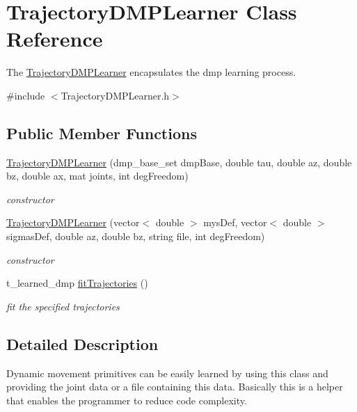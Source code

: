 \hypertarget{classTrajectoryDMPLearner}{\section{\-Trajectory\-D\-M\-P\-Learner \-Class \-Reference}
\label{classTrajectoryDMPLearner}
}


\-The \hyperlink{classTrajectoryDMPLearner}{\-Trajectory\-D\-M\-P\-Learner} encapsulates the dmp learning process.  




{\ttfamily \#include $<$\-Trajectory\-D\-M\-P\-Learner.\-h$>$}

\subsection*{\-Public \-Member \-Functions}
\begin{DoxyCompactItemize}
\item 
\hyperlink{classTrajectoryDMPLearner_ae80cd470937dcf56e62e6cbc7d958ecc}{\-Trajectory\-D\-M\-P\-Learner} (dmp\-\_\-base\-\_\-set dmp\-Base, double tau, double az, double bz, double ax, mat joints, int deg\-Freedom)
\begin{DoxyCompactList}\small\item\em constructor \end{DoxyCompactList}\item 
\hyperlink{classTrajectoryDMPLearner_a1bd0b3f7e7661d0675150c574ab443ef}{\-Trajectory\-D\-M\-P\-Learner} (vector$<$ double $>$ mys\-Def, vector$<$ double $>$ sigmas\-Def, double az, double bz, string file, int deg\-Freedom)
\begin{DoxyCompactList}\small\item\em constructor \end{DoxyCompactList}\item 
t\-\_\-learned\-\_\-dmp \hyperlink{classTrajectoryDMPLearner_a92336bee1a8d29ed6975017f5b41b41b}{fit\-Trajectories} ()
\begin{DoxyCompactList}\small\item\em fit the specified trajectories \end{DoxyCompactList}\end{DoxyCompactItemize}


\subsection{\-Detailed \-Description}
\-Dynamic movement primitives can be easily learned by using this class and providing the joint data or a file containing this data. \-Basically this is a helper that enables the programmer to reduce code complexity. 

